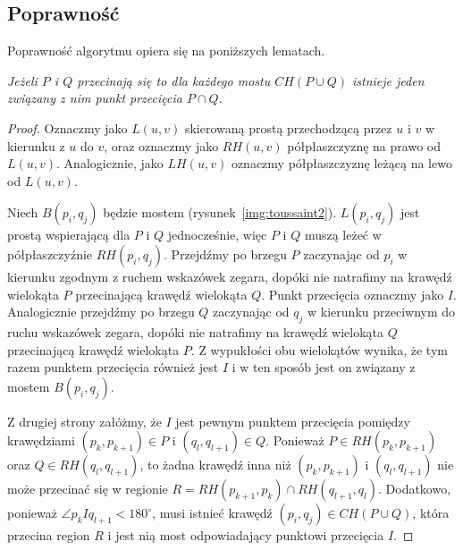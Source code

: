 \subsection{Poprawność}
Poprawność algorytmu opiera się na poniższych lematach.

\begin{lemat}\em{\cite{ToussaintInt}}
  Jeżeli $P$ i $Q$ przecinają się to dla każdego mostu $CH(P \cup Q)$
  istnieje jeden związany z nim punkt przecięcia $P \cap Q$.
\end{lemat}

\begin{proof}
  Oznaczmy jako $L(u, v)$ skierowaną prostą przechodzącą przez $u$ i
  $v$ w kierunku z $u$ do $v$, oraz oznaczmy jako $RH(u, v)$
  półpłaszczyznę na prawo od $L(u, v)$. Analogicznie, jako $LH(u, v)$
  oznaczmy półpłaszczyznę leżącą na lewo od $L(u, v)$.

  Niech $B(p_i, q_j)$ będzie mostem
  (rysunek~\ref{img:toussaint2}). $L(p_i, q_j)$ jest prostą
  wspierającą dla $P$ i $Q$ jednocześnie, więc $P$ i $Q$ muszą leżeć w
  półpłaszczyźnie $RH(p_i, q_j)$. Przejdźmy po brzegu $P$ zaczynając
  od $p_i$ w kierunku zgodnym z ruchem wskazówek zegara, dopóki nie
  natrafimy na krawędź wielokąta $P$ przecinającą krawędź wielokąta
  $Q$. Punkt przecięcia oznaczmy jako $I$. Analogicznie przejdźmy po
  brzegu $Q$ zaczynając od $q_j$ w kierunku przeciwnym do ruchu
  wskazówek zegara, dopóki nie natrafimy na krawędź wielokąta $Q$
  przecinającą krawędź wielokąta $P$. Z wypukłości obu wielokątów
  wynika, że tym razem punktem przecięcia również jest $I$ i w ten
  sposób jest on związany z mostem $B(p_i, q_j)$.

  Z drugiej strony załóżmy, że $I$ jest pewnym punktem przecięcia
  pomiędzy krawędziami $(p_k, p_{k+1}) \in P$ i $(q_l, q_{l+1}) \in
  Q$. Ponieważ $P \in RH(p_k, p_{k+1})$ oraz $Q \in RH(q_l, q_{l+1})$,
  to żadna krawędź inna niż $(p_k, p_{k+1})$ i $(q_l, q_{l+1})$ nie
  może przecinać się w regionie $R = RH(p_{k+1}, p_k) \cap RH(q_{l+1},
  q_l)$. Dodatkowo, ponieważ $\angle p_{k}Iq_{l+1} < 180^{\circ}$,
  musi istnieć krawędź $(p_i, q_j) \in CH(P \cup Q)$, która przecina
  region $R$ i jest nią most odpowiadający punktowi przecięcia $I$.
\end{proof}


